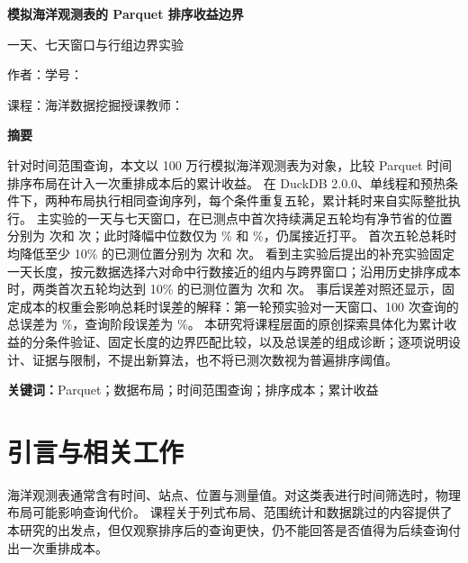 \documentclass[UTF8,a4paper,zihao=-4,fontset=none]{ctexart}
\newcommand{\pct}{\%}
\begin{document}
\thispagestyle{plain}
\begin{center}
  {\bfseries 模拟海洋观测表的 Parquet 排序收益边界\par}
  \vspace{5pt}
  {\large 一天、七天窗口与行组边界实验\par}
  \vspace{9pt}
  作者：\PaperAuthor\quad 学号：\StudentID\par
  {\small 课程：海洋数据挖掘\quad 授课教师：\CourseTeacher\par}
\end{center}
\noindent{}
\vspace{8pt}
\begin{center}\textbf{摘\quad 要}\end{center}
\noindent
针对时间范围查询，本文以 100 万行模拟海洋观测表为对象，比较 Parquet 时间排序布局在计入一次重排成本后的累计收益。
在 DuckDB 2.0.0、单线程和预热条件下，两种布局执行相同查询序列，每个条件重复五轮，累计耗时来自实际整批执行。
主实验的一天与七天窗口，在已测点中首次持续满足五轮均有净节省的位置分别为
\MainOneNetN{} 次和 \MainSevenNetN{} 次；此时降幅中位数仅为 \MainOneNetPct\pct{} 和 \MainSevenNetPct\pct{}，仍属接近打平。
首次五轮总耗时均降低至少 10\pct{} 的已测位置分别为 \MainOneTenN{} 次和 \MainSevenTenN{} 次。
看到主实验后提出的补充实验固定一天长度，按元数据选择六对命中行数接近的组内与跨界窗口；沿用历史排序成本时，两类首次五轮均达到 10\pct{} 的已测位置为 \SuppInsideAllN{} 次和 \SuppCrossAllN{} 次。
事后误差对照还显示，固定成本的权重会影响总耗时误差的解释：第一轮预实验对一天窗口、100 次查询的总误差为 \PilotOneDayOneHundredTotalErr\pct{}，查询阶段误差为 \PilotOneDayOneHundredQueryErr\pct{}。
本研究将课程层面的原创探索具体化为累计收益的分条件验证、固定长度的边界匹配比较，以及总误差的组成诊断；逐项说明设计、证据与限制，不提出新算法，也不将已测次数视为普遍排序阈值。

\medskip\noindent\textbf{关键词：}Parquet；数据布局；时间范围查询；排序成本；累计收益

\section{引言与相关工作}
\label{sec:intro}
海洋观测表通常含有时间、站点、位置与测量值。对这类表进行时间筛选时，物理布局可能影响查询代价。
课程关于列式布局、范围统计和数据跳过的内容提供了本研究的出发点\cite{course}，但仅观察排序后的查询更快，仍不能回答是否值得为后续查询付出一次重排成本。
\end{document}
